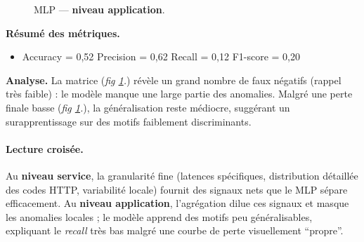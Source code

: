 \documentclass[conference]{IEEEtran}
\begin{document}
\begin{figure}[!t]
  \centering
  \hfill%
  \caption{MLP — \textbf{niveau application}.}
  \label{fig:mlp-app}
\end{figure}

\textbf{Résumé des métriques.}
\begin{itemize}
    \item Accuracy = 0{,}52 \quad
          Precision = 0{,}62 \quad
          Recall = 0{,}12 \quad
          F1-score = 0{,}20
\end{itemize}

\textbf{Analyse.}
La matrice (\textit{fig \ref{fig:mlp-app}.}) révèle un grand nombre de faux négatifs (rappel très faible) : le modèle manque une large partie des anomalies. 
Malgré une perte finale basse (\textit{fig \ref{fig:mlp-app}.}), la généralisation reste médiocre, suggérant un surapprentissage sur des motifs faiblement discriminants.

\paragraph{Lecture croisée.}
Au \textbf{niveau service}, la granularité fine (latences spécifiques, distribution détaillée des codes HTTP, variabilité locale) fournit des signaux nets que le MLP sépare efficacement. 
Au \textbf{niveau application}, l’agrégation dilue ces signaux et masque les anomalies locales ; le modèle apprend des motifs peu généralisables, expliquant le \textit{recall} très bas malgré une courbe de perte visuellement “propre”.
\end{document}
